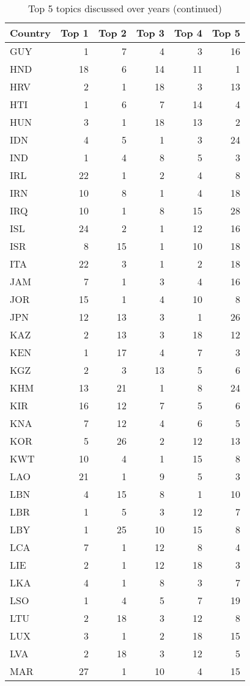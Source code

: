     
    
    \begin{table}
    \centering
    \caption{Top 5 topics discussed over years (continued)}
    \label{tab:top 5 topics all3}
    \begin{tabular}{lrrrrr}
    \toprule
    Country &     Top 1 &     Top 2 &     Top 3 &     Top 4 &     Top 5 \\
    \midrule
    GUY  & 1 & 7 & 4 & 3 & 16\\
    HND  & 18 & 6 & 14 & 11 & 1\\
    HRV  & 2 & 1 & 18 & 3 & 13\\
    HTI  & 1 & 6 & 7 & 14 & 4\\
    HUN  & 3 & 1 & 18 & 13 & 2\\
    IDN  & 4 & 5 & 1 & 3 & 24\\
    IND  & 1 & 4 & 8 & 5 & 3\\
    IRL  & 22 & 1 & 2 & 4 & 8\\
    IRN  & 10 & 8 & 1 & 4 & 18\\
    IRQ  & 10 & 1 & 8 & 15 & 28\\
    ISL  & 24 & 2 & 1 & 12 & 16\\
    ISR  & 8 & 15 & 1 & 10 & 18\\
    ITA  & 22 & 3 & 1 & 2 & 18\\
    JAM  & 7 & 1 & 3 & 4 & 16\\
    JOR  & 15 & 1 & 4 & 10 & 8\\
    JPN  & 12 & 13 & 3 & 1 & 26\\
    KAZ  & 2 & 13 & 3 & 18 & 12\\
    KEN  & 1 & 17 & 4 & 7 & 3\\
    KGZ  & 2 & 3 & 13 & 5 & 6\\
    KHM  & 13 & 21 & 1 & 8 & 24\\
    KIR  & 16 & 12 & 7 & 5 & 6\\
    KNA  & 7 & 12 & 4 & 6 & 5\\
    KOR  & 5 & 26 & 2 & 12 & 13\\
    KWT  & 10 & 4 & 1 & 15 & 8\\
    LAO  & 21 & 1 & 9 & 5 & 3\\
    LBN  & 4 & 15 & 8 & 1 & 10\\
    LBR  & 1 & 5 & 3 & 12 & 7\\
    LBY  & 1 & 25 & 10 & 15 & 8\\
    LCA  & 7 & 1 & 12 & 8 & 4\\
    LIE  & 2 & 1 & 12 & 18 & 3\\
    LKA  & 4 & 1 & 8 & 3 & 7\\
    LSO  & 1 & 4 & 5 & 7 & 19\\
    LTU  & 2 & 18 & 3 & 12 & 8\\
    LUX  & 3 & 1 & 2 & 18 & 15\\
    LVA  & 2 & 18 & 3 & 12 & 5\\
    MAR  & 27 & 1 & 10 & 4 & 15\\
    \bottomrule
    \end{tabular}\end{table}
    
